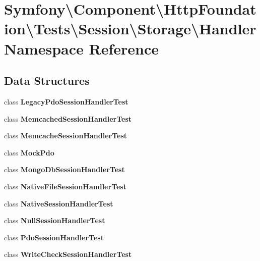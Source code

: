 \section{Symfony\textbackslash{}Component\textbackslash{}Http\+Foundation\textbackslash{}Tests\textbackslash{}Session\textbackslash{}Storage\textbackslash{}Handler Namespace Reference}
\label{namespace_symfony_1_1_component_1_1_http_foundation_1_1_tests_1_1_session_1_1_storage_1_1_handler}
\subsection*{Data Structures}
\begin{DoxyCompactItemize}
\item 
class {\bf Legacy\+Pdo\+Session\+Handler\+Test}
\item 
class {\bf Memcached\+Session\+Handler\+Test}
\item 
class {\bf Memcache\+Session\+Handler\+Test}
\item 
class {\bf Mock\+Pdo}
\item 
class {\bf Mongo\+Db\+Session\+Handler\+Test}
\item 
class {\bf Native\+File\+Session\+Handler\+Test}
\item 
class {\bf Native\+Session\+Handler\+Test}
\item 
class {\bf Null\+Session\+Handler\+Test}
\item 
class {\bf Pdo\+Session\+Handler\+Test}
\item 
class {\bf Write\+Check\+Session\+Handler\+Test}
\end{DoxyCompactItemize}

